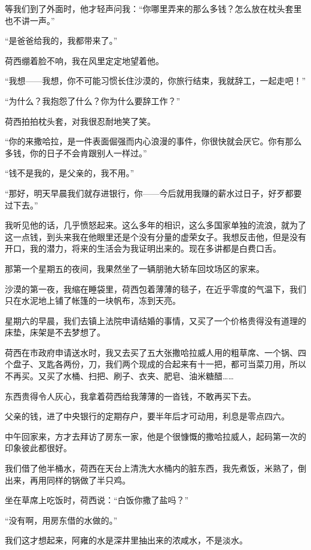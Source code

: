 \par 等我们到了外面时，他才轻声问我：“你哪里弄来的那么多钱？怎么放在枕头套里也不讲一声。”
\par “是爸爸给我的，我都带来了。”
\par 荷西绷着脸不响，我在风里定定地望着他。
\par “我想——我想，你不可能习惯长住沙漠的，你旅行结束，我就辞工，一起走吧！”
\par “为什么？我抱怨了什么？你为什么要辞工作？”
\par 荷西拍拍枕头套，对我很忍耐地笑了笑。
\par “你的来撒哈拉，是一件表面倔强而内心浪漫的事件，你很快就会厌它。你有那么多钱，你的日子不会肯跟别人一样过。”
\par “钱不是我的，是父亲的，我不用。”
\par “那好，明天早晨我们就存进银行，你——今后就用我赚的薪水过日子，好歹都要过下去。”
\par 我听见他的话，几乎愤怒起来。这么多年的相识，这么多国家单独的流浪，就为了这一点钱，到头来我在他眼里还是个没有分量的虚荣女子。我想反击他，但是没有开口，我的潜力，将来的生活会为我证明出来的。现在多讲都是白费口舌。
\par 那第一个星期五的夜间，我果然坐了一辆朋驰大轿车回坟场区的家来。
\par 沙漠的第一夜，我缩在睡袋里，荷西包着薄薄的毯子，在近乎零度的气温下，我们只在水泥地上铺了帐篷的一块帆布，冻到天亮。
\par 星期六的早晨，我们去镇上法院申请结婚的事情，又买了一个价格贵得没有道理的床垫，床架是不去梦想了。
\par 荷西在市政府申请送水时，我又去买了五大张撒哈拉威人用的粗草席、一个锅、四个盘子、叉匙各两份，刀，我们两个现成的合起来有十一把，都可当菜刀用，所以不再买。又买了水桶、扫把、刷子、衣夹、肥皂、油米糖醋……
\par 东西贵得令人灰心，我拿着荷西给我薄薄的一沓钱，不敢再买下去。
\par 父亲的钱，进了中央银行的定期存户，要半年后才可动用，利息是零点四六。
\par 中午回家来，方才去拜访了房东一家，他是个很慷慨的撒哈拉威人，起码第一次的印象彼此都很好。
\par 我们借了他半桶水，荷西在天台上清洗大水桶内的脏东西，我先煮饭，米熟了，倒出来，再用同样的锅做了半只鸡。
\par 坐在草席上吃饭时，荷西说：“白饭你撒了盐吗？”
\par “没有啊，用房东借的水做的。”
\par 我们这才想起来，阿雍的水是深井里抽出来的浓咸水，不是淡水。
